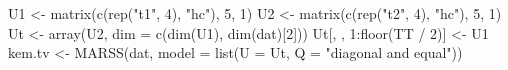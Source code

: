 \begin{Schunk}
\begin{Sinput}
 U1 <- matrix(c(rep("t1", 4), "hc"), 5, 1)
 U2 <- matrix(c(rep("t2", 4), "hc"), 5, 1)
 Ut <- array(U2, dim = c(dim(U1), dim(dat)[2]))
 Ut[, , 1:floor(TT / 2)] <- U1
 kem.tv <- MARSS(dat, model = list(U = Ut, Q = "diagonal and equal"))
\end{Sinput}
\end{Schunk}
